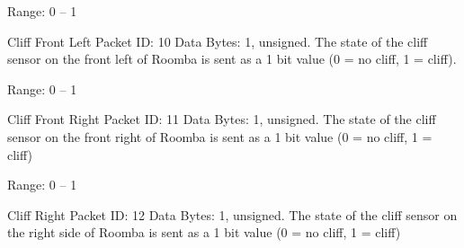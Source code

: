 \begin{Desc}
\begin{description}
Range\+: 0 – 1 \item[{\em 
\hypertarget{group__roomba-lib_gga46f008b5055c4a08d3123c6a3478373eaaf46988ebd91103295f53cff3b13d3c9}{}R\+O\+O\+M\+B\+A\+\_\+\+C\+L\+I\+F\+F\+\_\+\+F\+R\+O\+N\+T\+\_\+\+L\+E\+F\+T\label{group__roomba-lib_gga46f008b5055c4a08d3123c6a3478373eaaf46988ebd91103295f53cff3b13d3c9}
}]Cliff Front Left Packet I\+D\+: 10 Data Bytes\+: 1, unsigned. The state of the cliff sensor on the front left of Roomba is sent as a 1 bit value (0 = no cliff, 1 = cliff).

Range\+: 0 – 1 \item[{\em 
\hypertarget{group__roomba-lib_gga46f008b5055c4a08d3123c6a3478373ea8dc2c319fff150dfaf3ebe832a89571d}{}R\+O\+O\+M\+B\+A\+\_\+\+C\+L\+I\+F\+F\+\_\+\+F\+R\+O\+N\+T\+\_\+\+R\+I\+G\+H\+T\label{group__roomba-lib_gga46f008b5055c4a08d3123c6a3478373ea8dc2c319fff150dfaf3ebe832a89571d}
}]Cliff Front Right Packet I\+D\+: 11 Data Bytes\+: 1, unsigned. The state of the cliff sensor on the front right of Roomba is sent as a 1 bit value (0 = no cliff, 1 = cliff)

Range\+: 0 – 1 \item[{\em 
\hypertarget{group__roomba-lib_gga46f008b5055c4a08d3123c6a3478373eabfc438ea8d6ad4505d651226791efe43}{}R\+O\+O\+M\+B\+A\+\_\+\+C\+L\+I\+F\+F\+\_\+\+R\+I\+G\+H\+T\label{group__roomba-lib_gga46f008b5055c4a08d3123c6a3478373eabfc438ea8d6ad4505d651226791efe43}
}]Cliff Right Packet I\+D\+: 12 Data Bytes\+: 1, unsigned. The state of the cliff sensor on the right side of Roomba is sent as a 1 bit value (0 = no cliff, 1 = cliff)


\end{description}
\end{Desc}
